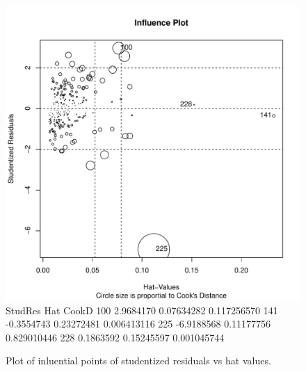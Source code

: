 \documentclass[11pt]{article}\usepackage[]{graphicx}\usepackage[]{color}
\makeatletter
\def\maxwidth{ %
  \ifdim\Gin@nat@width>\linewidth
    \linewidth
  \else
    \Gin@nat@width
  \fi
}
\makeatother
\begin{document}
\begin{figure}[h!] 
\begin{center}

\includegraphics[width=\maxwidth]{figure/unnamed-chunk-13-1} 
       StudRes        Hat       CookD
100  2.9684170 0.07634282 0.117256570
141 -0.3554743 0.23272481 0.006413116
225 -6.9188568 0.11177756 0.829010446
228  0.1863592 0.15245597 0.001045744

\caption{Plot of inluential points of studentized residuals vs hat values.}
\label{influential-points}
\end{center} 
\end{figure}
\end{document}
